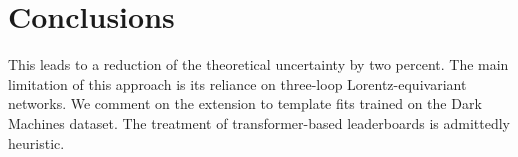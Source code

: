 \section{Conclusions}\label{sec:conclusions}

This leads to a reduction of the theoretical uncertainty by two percent.
The main limitation of this approach is its reliance on three-loop
Lorentz-equivariant networks. We comment on the extension to template
fits trained on the Dark Machines dataset. The treatment of
transformer-based leaderboards is admittedly heuristic.

